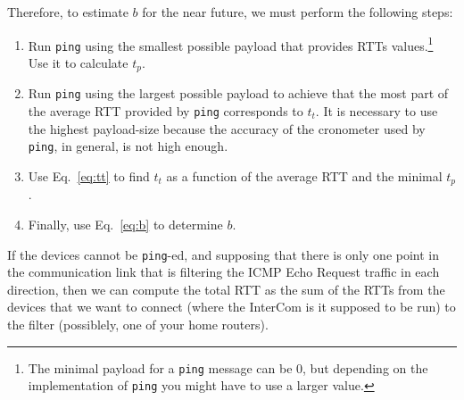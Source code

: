 Therefore, to estimate $b$ for the near future, we must perform the
following steps:

\begin{enumerate}
  
\item Run \texttt{ping} using the smallest possible payload that
  provides RTTs values.\footnote{The minimal payload for a
    \texttt{ping} message can be 0, but depending on the
    implementation of \texttt{ping} you might have to use a larger
    value.} Use it to calculate $t_p$.
  
\item Run \texttt{ping} using the largest possible payload to achieve
  that the most part of the average RTT provided by \texttt{ping}
  corresponds to $t_t$. It is necessary to use the highest
  payload-size because the accuracy of the cronometer used by
  \texttt{ping}, in general, is not high enough.
  
\item Use Eq.~\eqref{eq:tt} to find $t_t$ as a function of the average
  RTT and the minimal $t_p$.
  
\item Finally, use Eq.~\eqref{eq:b} to determine $b$.
  
\end{enumerate}

If the devices cannot be \texttt{ping}-ed, and supposing that there is
only one point in the communication link that is filtering the ICMP
Echo Request traffic in each direction, then we can compute the total RTT as
the sum of the RTTs from the devices that we want to connect (where
the InterCom is it supposed to be run) to the filter (possiblely, one
of your home routers).



